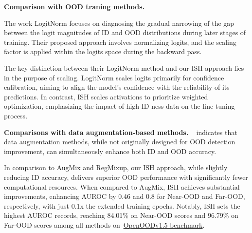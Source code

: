 \documentclass{article} %
\theoremstyle{plain}
\begin{document}
{\textbf{Comparison with OOD traning methods.}} 

The work LogitNorm\citep{DBLP:conf/icml/WeiXCF0L22/LogitNorm} focuses on diagnosing the gradual narrowing of the gap between the logit magnitudes of ID and OOD distributions during later stages of training. Their proposed approach involves normalizing logits, and the scaling factor is applied within the logits space during the backward pass.

The key distinction between their LogitNorm method and our ISH approach lies in the purpose of scaling. LogitNorm scales logits primarily for confidence calibration, aiming to align the model's confidence with the reliability of its predictions. In contrast, ISH scales activations to prioritize weighted optimization, emphasizing the impact of high ID-ness data on the fine-tuning process.

\textbf{Comparisons with data augmentation-based methods.}
~\cite{DBLP:journals/corr/abs-2306-09301/OpenOODv1.5} indicates that data augmentation methods, while not originally designed for OOD detection improvement, can simultaneously enhance both ID and OOD accuracy. 

In comparison to AugMix and RegMixup, our ISH approach, while slightly reducing ID accuracy, delivers superior OOD performance with significantly fewer computational resources. When compared to AugMix, ISH achieves substantial improvements, enhancing AUROC by 0.46 and 0.8 for Near-OOD and Far-OOD, respectively, with just 0.1x the extended training epochs. Notably, ISH sets the highest AUROC records, reaching 84.01\% on Near-OOD scores and 96.79\% on Far-OOD scores among all methods on~\href{https://zjysteven.github.io/OpenOOD/}{OpenOODv1.5 benchmark}.
\end{document}
